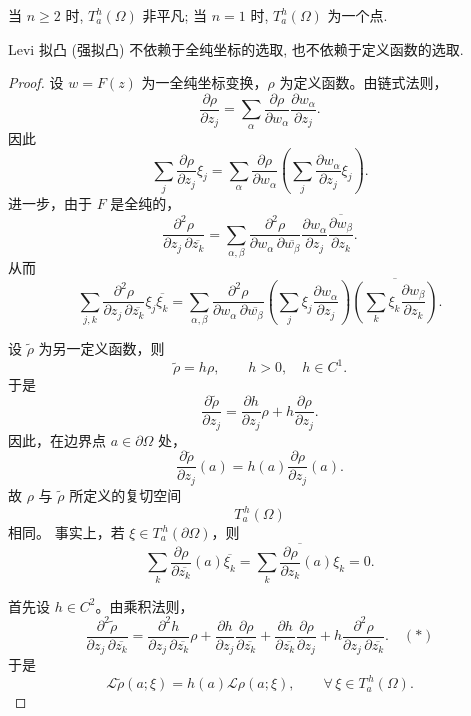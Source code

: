 \begin{remark}
    当 $n \geq 2$ 时, $T_{a}^{h}(\Omega )$ 非平凡;  当 $n =1 $ 时, $T_{a}^{h}(\Omega )$ 为一个点.
\end{remark}

\begin{proposition}
    Levi 拟凸 (强拟凸) 不依赖于全纯坐标的选取, 也不依赖于定义函数的选取.
\end{proposition}
\begin{proof}
设 \(w=F(z)\) 为一全纯坐标变换，\(\rho\) 为定义函数。由链式法则，
\[
\frac{\partial \rho}{\partial z_j}
=
\sum_{\alpha}
\frac{\partial \rho}{\partial w_\alpha}
\frac{\partial w_\alpha}{\partial z_j}.
\]
因此
\[
\sum_j \frac{\partial \rho}{\partial z_j}\xi_j
=
\sum_\alpha
\frac{\partial \rho}{\partial w_\alpha}
\left(
\sum_j
\frac{\partial w_\alpha}{\partial z_j}\xi_j
\right).
\]
进一步，由于 \(F\) 是全纯的，
\[
\frac{\partial^2\rho}
     {\partial z_j\,\partial\overline{z_k}}
=
\sum_{\alpha,\beta}
\frac{\partial^2\rho}
     {\partial w_\alpha\,\partial\overline{w_\beta}}
\frac{\partial w_\alpha}{\partial z_j}
\overline{
\frac{\partial w_\beta}{\partial z_k}
}.
\]
从而
\[
\sum_{j,k}
\frac{\partial^2\rho}
     {\partial z_j\,\partial\overline{z_k}}
\xi_j\overline{\xi_k}
=
\sum_{\alpha,\beta}
\frac{\partial^2\rho}
     {\partial w_\alpha\,\partial\overline{w_\beta}}
\left(
\sum_j \xi_j\frac{\partial w_\alpha}{\partial z_j}
\right)
\overline{
\left(
\sum_k \xi_k\frac{\partial w_\beta}{\partial z_k}
\right)
}.
\]

设 \(\tilde{\rho }\) 为另一定义函数，则
\[
\widetilde{\rho}=h\rho,
\qquad h>0,\quad h\in C^1.
\]
于是
\[
\frac{\partial\widetilde{\rho}}{\partial z_j}
=
\frac{\partial h}{\partial z_j}\rho
+
h\frac{\partial\rho}{\partial z_j}.
\]
因此，在边界点 \(a\in\partial\Omega\) 处，
\[
\frac{\partial\widetilde{\rho}}{\partial z_j}(a)
=
h(a)\frac{\partial\rho}{\partial z_j}(a).
\]
故 \(\rho\) 与 \(\widetilde{\rho}\) 所定义的复切空间
\[
T_a^{\,h}(\Omega)
\]
相同。
事实上，若 \(\xi\in T_a^{\,h}(\partial\Omega)\)，则
\[
\sum_k
\frac{\partial\rho}{\partial\overline{z_k}}(a)
\overline{\xi_k}
=
\overline{
\sum_k
\frac{\partial\rho}{\partial z_k}(a)\xi_k
}
=0.
\]

首先设 \(h\in C^2\)。由乘积法则，
\[
\frac{\partial^2\widetilde{\rho}}
     {\partial z_j\,\partial\overline{z_k}}
=
\frac{\partial^2h}
     {\partial z_j\,\partial\overline{z_k}}\rho
+
\frac{\partial h}{\partial z_j}
\frac{\partial\rho}{\partial\overline{z_k}}
+
\frac{\partial h}{\partial\overline{z_k}}
\frac{\partial\rho}{\partial z_j}
+
h\frac{\partial^2\rho}
       {\partial z_j\,\partial\overline{z_k}}. \quad
(*)
\]
于是
\[  
\mathcal{L} \widetilde{\rho}(a;\xi)
=
h(a)\mathcal{L}\rho(a;\xi),
\qquad
\forall\,\xi\in T_a^{\,h}(\Omega).
\]


\end{proof}
